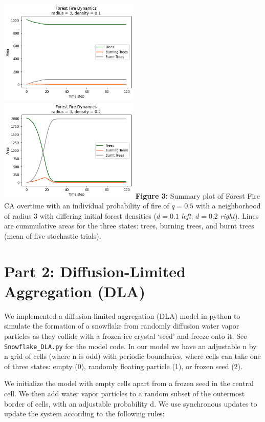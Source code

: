 \documentclass[]{article}
\begin{document}
\includegraphics[width=0.5\textwidth,height=\textheight]{../plots/r3d1.png}
\includegraphics[width=0.5\textwidth,height=\textheight]{../plots/r3d2.png}
\textbf{Figure 3:} Summary plot of Forest Fire CA overtime with an
individual probability of fire of \(q = 0.5\) with a neighborhood of
radius 3 with differing initial forest densities (\(d = 0.1\)
\emph{left}; \(d = 0.2\) \emph{right}). Lines are cummulative areas for
the three states: trees, burning trees, and burnt trees (mean of five
stochastic trials).

\pagebreak

\hypertarget{part-2-diffusion-limited-aggregation-dla}{%
\section{Part 2: Diffusion-Limited Aggregation
(DLA)}\label{part-2-diffusion-limited-aggregation-dla}}

We implemented a diffusion-limited aggregation (DLA) model in python to
simulate the formation of a snowflake from randomly diffusion water
vapor particles as they collide with a frozen ice crystal `seed' and
freeze onto it. See \texttt{Snowflake\_DLA.py} for the model code. In
our model we have an adjustable n by n grid of cells (where n is odd)
with periodic boundaries, where cells can take one of three states:
empty (0), randomly floating particle (1), or frozen seed (2).

We initialize the model with empty cells apart from a frozen seed in the
central cell. We then add water vapor particles to a random subset of
the outermost border of cells, with an adjustable probability d. We use
synchronous updates to update the system according to the following
rules:
\end{document}
